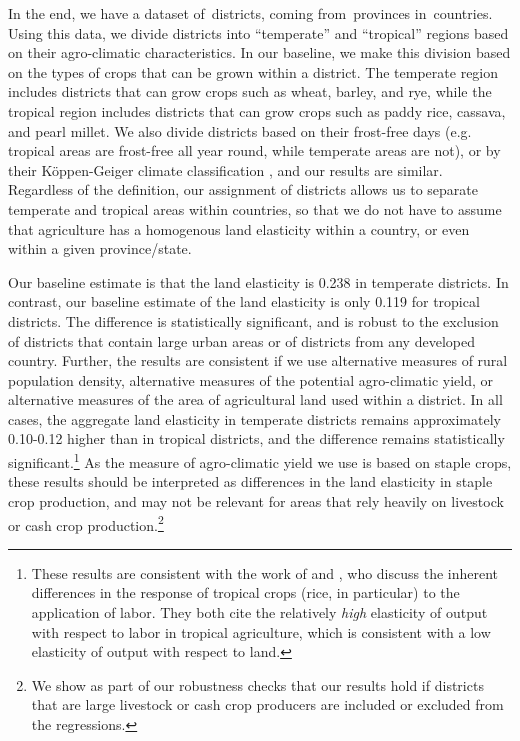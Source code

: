 \documentclass[11pt]{article}
\begin{document}
In the end, we have a dataset of\districts \ districts, coming from\provinces \ provinces in\countries \ countries. Using this data, we divide districts into ``temperate'' and ``tropical'' regions based on their agro-climatic characteristics. In our baseline, we make this division based on the types of crops that can be grown within a district. The temperate region includes districts that can grow crops such as wheat, barley, and rye, while the tropical region includes districts that can grow crops such as paddy rice, cassava, and pearl millet. We also divide districts based on their frost-free days (e.g. tropical areas are frost-free all year round, while temperate areas are not), or by their K{\"o}ppen-Geiger climate classification \citep{kottek2006}, and our results are similar. Regardless of the definition, our assignment of districts allows us to separate temperate and tropical areas within countries, so that we do not have to assume that agriculture has a homogenous land elasticity within a country, or even within a given province/state. 

Our baseline estimate is that the land elasticity is 0.238 in temperate districts. In contrast, our baseline estimate of the land elasticity is only 0.119 for tropical districts. The difference is statistically significant, and is robust to the exclusion of districts that contain large urban areas or of districts from any developed country. Further, the results are consistent if we use alternative measures of rural population density, alternative measures of the potential agro-climatic yield, or alternative measures of the area of agricultural land used within a district. In all cases, the aggregate land elasticity in temperate districts remains approximately 0.10-0.12 higher than in tropical districts, and the difference remains statistically significant.\footnote{These results are consistent with the work of \citet{Ruthenberg:1976zr} and \citet{bray1994}, who discuss the inherent differences in the response of tropical crops (rice, in particular) to the application of labor. They both cite the relatively \textit{high} elasticity of output with respect to labor in tropical agriculture, which is consistent with a low elasticity of output with respect to land.} As the measure of agro-climatic yield we use is based on staple crops, these results should be interpreted as differences in the land elasticity in staple crop production, and may not be relevant for areas that rely heavily on livestock or cash crop production.\footnote{We show as part of our robustness checks that our results hold if districts that are large livestock or cash crop producers are included or excluded from the regressions.}
\end{document}
